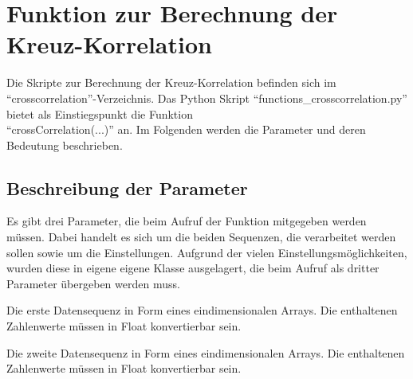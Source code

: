 \chapter{Funktion zur Berechnung der Kreuz-Korrelation}
Die Skripte zur Berechnung der Kreuz-Korrelation befinden sich im \enquote{crosscorrelation}-Verzeichnis.
Das Python Skript \enquote{functions\_crosscorrelation.py} bietet als Einstiegspunkt die Funktion\\ \mbox{\enquote{crossCorrelation(...)}} an. Im Folgenden werden die Parameter und deren Bedeutung beschrieben.

\section{Beschreibung der Parameter}

Es gibt drei Parameter, die beim Aufruf der Funktion mitgegeben werden müssen. Dabei handelt es sich um die beiden Sequenzen, die verarbeitet werden sollen sowie um die Einstellungen. Aufgrund der vielen Einstellungsmöglichkeiten, wurden diese in eigene eigene Klasse ausgelagert, die beim Aufruf als dritter Parameter übergeben werden muss.
\begin{description}[style=nextline]
\item[seqA] Die erste Datensequenz in Form eines eindimensionalen Arrays. Die enthaltenen Zahlenwerte müssen in Float konvertierbar sein.
\item[seqB] Die zweite Datensequenz in Form eines eindimensionalen Arrays. Die enthaltenen Zahlenwerte müssen in Float konvertierbar sein.
\end{description}

